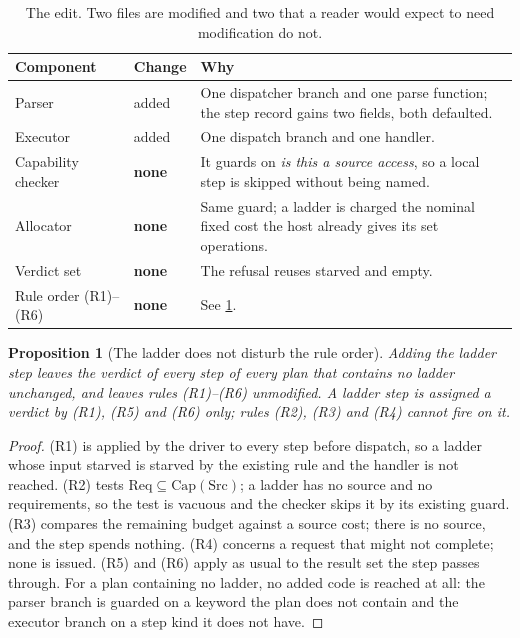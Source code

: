 \documentclass[11pt,twocolumn,a4paper]{article}
\theoremstyle{plain}
\newtheorem{proposition}[theorem]{Proposition}
\theoremstyle{definition}
\theoremstyle{remark}
\newcommand{\Src}{\mathrm{Src}}
\newcommand{\Capset}{\mathrm{Cap}}
\newcommand{\Req}{\mathrm{Req}}
\newcommand{\vempty}{\textsf{empty}}
\newcommand{\vstarve}{\textsf{starved}}
\begin{document}
\begin{table}[!htbp]
\centering
\caption{The edit. Two files are modified and two that a reader would expect to
need modification do not.}
\label{tab:edit}
\begin{tabular}{llp{6.4cm}}
\toprule
Component & Change & Why \\
\midrule
Parser & added & One dispatcher branch and one parse function; the step
record gains two fields, both defaulted. \\
Executor & added & One dispatch branch and one handler. \\
Capability checker & \textbf{none} & It guards on \emph{is this a source
access}, so a local step is skipped without being named. \\
Allocator & \textbf{none} & Same guard; a ladder is charged the nominal fixed
cost the host already gives its set operations. \\
Verdict set & \textbf{none} & The refusal reuses \vstarve{} and \vempty. \\
Rule order (R1)--(R6) & \textbf{none} & See \cref{prop:noorder}. \\
\bottomrule
\end{tabular}
\end{table}

\begin{proposition}[The ladder does not disturb the rule order]
\label{prop:noorder}
Adding the ladder step leaves the verdict of every step of every plan that
contains no ladder unchanged, and leaves rules (R1)--(R6) unmodified. A ladder
step is assigned a verdict by (R1), (R5) and (R6) only; rules (R2), (R3) and
(R4) cannot fire on it.
\end{proposition}

\begin{proof}
(R1) is applied by the driver to every step before dispatch, so a ladder whose
input starved is starved by the existing rule and the handler is not reached.
(R2) tests $\Req\subseteq\Capset(\Src)$; a ladder has no source and no
requirements, so the test is vacuous and the checker skips it by its existing
guard. (R3) compares the remaining budget against a source cost; there is no
source, and the step spends nothing. (R4) concerns a request that might not
complete; none is issued. (R5) and (R6) apply as usual to the result set the
step passes through. For a plan containing no ladder, no added code is reached
at all: the parser branch is guarded on a keyword the plan does not contain and
the executor branch on a step kind it does not have.
\end{proof}
\end{document}
